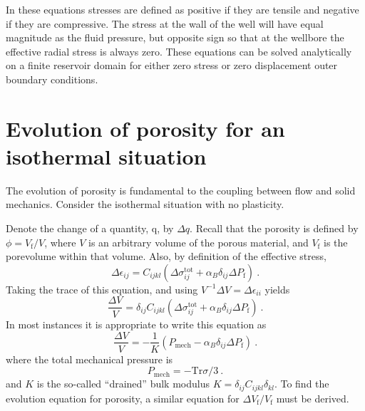 \documentclass[12pt]{report}
\def\mechpressure{P_{\mathrm{mech}}}
\begin{document}
In these equations stresses are defined as positive if they are tensile and negative if they are compressive. The stress at the wall of the well will have equal magnitude as the fluid pressure, but opposite sign so that at the wellbore the effective radial stress is always zero.  These equations can be solved analytically on a finite reservoir domain for either zero stress or zero displacement outer boundary conditions.

%
%

\chapter{Evolution of porosity for an isothermal situation}
\label{chap.evol.por}

The evolution of porosity is fundamental to the coupling between flow
and solid mechanics.  Consider the isothermal situation with no
plasticity.

Denote the change of a quantity, q, by $\Delta
q$.  Recall that the porosity is defined by $\phi = V_{\mathrm{f}}/V$,
where $V$ is an arbitrary volume of the porous material, and
$V_{\mathrm{f}}$ is the porevolume within that volume.  Also, by
definition of the effective stress,
\begin{equation}
\Delta \epsilon_{ij} = C_{ijkl}(\Delta\sigma_{ij}^{\mathrm{tot}}  + \alpha_{B}
\delta_{ij}\Delta P_{\mathrm{f}})
\ .
\end{equation}
Taking the trace of this equation, and using $V^{-1}\Delta V = \Delta
\epsilon_{ii}$ yields
\begin{equation}
\frac{\Delta V}{V} = \delta_{ij}C_{ijkl}(\Delta\sigma_{ij}^{\mathrm{tot}}+
\alpha_{B} \delta_{ij}\Delta P_{\mathrm{f}})
\ .
\end{equation}
In most instances it is appropriate to write this equation as
\begin{equation}
\frac{\Delta V}{V} = -\frac{1}{K}(\mechpressure - \alpha_{B} \delta_{ij}\Delta P_{\mathrm{f}})
\ .
\label{eqn.fund.volstrain}
\end{equation}
where the total mechanical pressure is
\begin{equation}
\mechpressure = - \mbox{Tr}\sigma/3 \ .
\end{equation}
and $K$ is the so-called ``drained'' bulk modulus $K = \delta_{ij}C_{ijkl}\delta_{kl}$.
To find the evolution equation for porosity, a similar equation for
$\Delta V_{\mathrm{f}}/V_{\mathrm{f}}$ must be derived.
\end{document}
